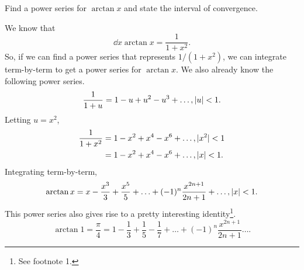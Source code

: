 \begin{example}
	Find a power series for $\arctan{x}$ and state the interval of convergence.
\end{example}
We know that
\begin{equation*}
	\dd{}{x}\arctan{x} = \frac{1}{1+x^2}.
\end{equation*}
\indent
So, if we can find a power series that represents $1/(1+x^2)$, we can integrate term-by-term to get a power series for $\arctan{x}$.
We also already know the following power series.
\begin{equation*}
	\frac{1}{1+u} = 1 - u + u^2 - u^3 + \ldots, \lvert u \rvert < 1.
\end{equation*}
\indent
Letting $u=x^2$,
\begin{align*}
	\frac{1}{1+x^2} &= 1 - x^2 + x^4 - x^6 + \ldots, \lvert x^2 \rvert < 1 \\
	&= 1 - x^2 + x^4 - x^6 + \ldots, \lvert x \rvert < 1.
\end{align*}
\indent
Integrating term-by-term,
\begin{align*}
	\arctan{x} = x - \frac{x^3}{3} + \frac{x^5}{5} + \ldots + (-1)^n\frac{x^{2n+1}}{2n+1} + \ldots, \lvert x \rvert < 1.
\end{align*}
\indent
This power series also gives rise to a pretty interesting identity\footnote{See footnote 1.}.
\begin{equation*}
	\arctan{1} = \frac{\pi}{4} = 1 - \frac{1}{3} + \frac{1}{5} - \frac{1}{7} + \ldots + (-1)^n\frac{x^{2n+1}}{2n+1} \ldots.
\end{equation*}